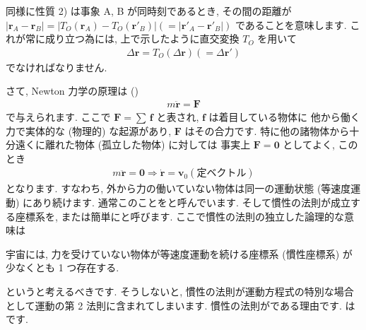 \documentclass[openany, a4paper, oneside]{jsbook}
\begin{document}
同様に性質 2) は事象 A, B が同時刻であるとき,
その間の距離が
 $| \bm{r}_A - \bm{r}_B | = | T_O ( \bm{r}_A ) - T_O ( \bm{r}'_B ) | ( = | \bm{r}'_A - \bm{r}'_B | )$
であることを意味します.
これが常に成り立つ為には, 上で示したように直交変換 $T_O$ を用いて
\begin{gather}
    \varDelta \bm{r} = T_O ( \varDelta \bm{r} ) ( = \varDelta \bm{r}' )
\end{gather}
でなければなりません.

さて, Newton 力学の原理は
()
\begin{gather}
    m \ddot{ \bm{r} }
    =
    \bm{F}
\end{gather}
で与えられます.
ここで $\bm{F}=\sum \, \bm{f}$ と表され,  $\bm{f}$ は着目している物体に
他から働く力で実体的な (物理的) な起源があり, $\bm{F}$ はその合力です.
特に他の諸物体から十分遠くに離れた物体 (孤立した物体) に対しては
事実上 $\bm{F}=\bm{0}$ としてよく, このとき
\begin{gather}
    m \ddot{ \bm{r} }
    =
    \bm{0}
    \Longrightarrow
    \dot{ \bm{r} }
    =
    \bm{v}_0 ( \text{定ベクトル} )
\end{gather}
となります.
すなわち, 外から力の働いていない物体は同一の運動状態 (等速度運動) にあり続けます.
通常このことをと呼んでいます.
そして慣性の法則が成立する座標系を,
または簡単にと呼びます.
ここで慣性の法則の独立した論理的な意味は
\begin{req}
宇宙には, 力を受けていない物体が等速度運動を続ける座標系 (慣性座標系) が少なくとも 1 つ存在する.
\end{req}
というと考えるべきです.
そうしないと, 慣性の法則が運動方程式の特別な場合として運動の第 2 法則に含まれてしまいます.
慣性の法則がである理由です.
は
です.
\end{document}
